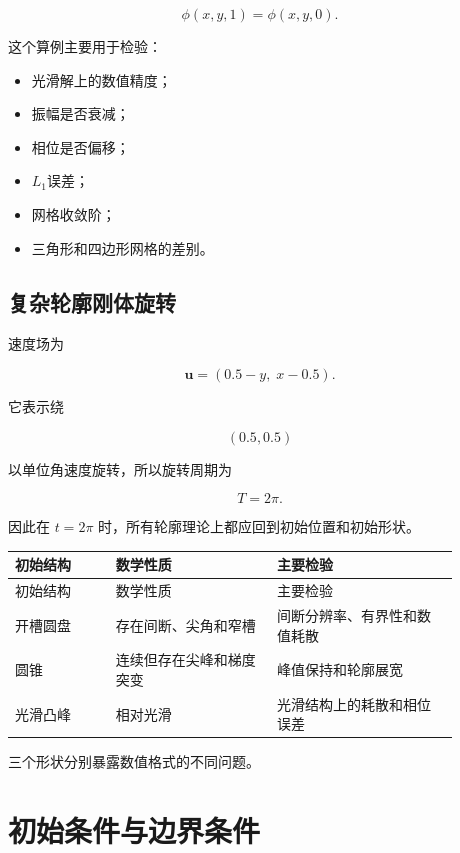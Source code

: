 \documentclass[UTF8,12pt,a4paper,fontset=fandol]{ctexart}
\begin{document}
\begin{equation}
\phi(x,y,1)=\phi(x,y,0).
\end{equation}

这个算例主要用于检验：

\begin{itemize}
  \item 光滑解上的数值精度；
  \item 振幅是否衰减；
  \item 相位是否偏移；
  \item $L_1$误差；
  \item 网格收敛阶；
  \item 三角形和四边形网格的差别。
\end{itemize}

\subsection{复杂轮廓刚体旋转}

速度场为

\begin{equation}
\bm u=(0.5-y,\;x-0.5).
\end{equation}

它表示绕

\begin{equation}
(0.5,0.5)
\end{equation}

以单位角速度旋转，所以旋转周期为

\begin{equation}
T=2\pi.
\end{equation}

因此在 $t=2\pi$ 时，所有轮廓理论上都应回到初始位置和初始形状。

\begin{longtable}{L{0.20\linewidth}L{0.32\linewidth}L{0.36\linewidth}}
\toprule
初始结构 & 数学性质 & 主要检验\\
\midrule
\endfirsthead
\toprule
初始结构 & 数学性质 & 主要检验\\
\midrule
\endhead
开槽圆盘 & 存在间断、尖角和窄槽 & 间断分辨率、有界性和数值耗散\\
圆锥 & 连续但存在尖峰和梯度突变 & 峰值保持和轮廓展宽\\
光滑凸峰 & 相对光滑 & 光滑结构上的耗散和相位误差\\
\bottomrule
\end{longtable}

三个形状分别暴露数值格式的不同问题。

\section{初始条件与边界条件}
\end{document}
